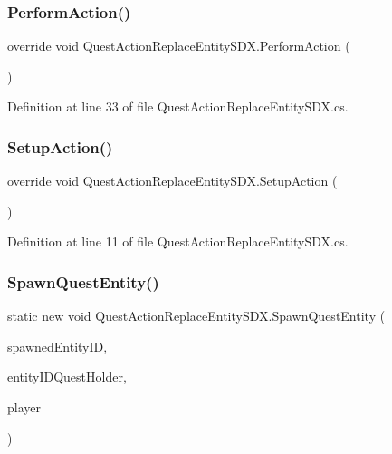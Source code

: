 \mbox{\label{class_quest_action_replace_entity_s_d_x_a01f8dc126bd37662f40449931ce327ba}} 
\subsubsection{\texorpdfstring{PerformAction()}{PerformAction()}}
{\footnotesize\ttfamily override void Quest\+Action\+Replace\+Entity\+S\+D\+X.\+Perform\+Action (\begin{DoxyParamCaption}{ }\end{DoxyParamCaption})}



Definition at line 33 of file Quest\+Action\+Replace\+Entity\+S\+D\+X.\+cs.

\mbox{\label{class_quest_action_replace_entity_s_d_x_a28155d29875c6d123001c03de564a6a6}} 
\subsubsection{\texorpdfstring{SetupAction()}{SetupAction()}}
{\footnotesize\ttfamily override void Quest\+Action\+Replace\+Entity\+S\+D\+X.\+Setup\+Action (\begin{DoxyParamCaption}{ }\end{DoxyParamCaption})}



Definition at line 11 of file Quest\+Action\+Replace\+Entity\+S\+D\+X.\+cs.

\mbox{\label{class_quest_action_replace_entity_s_d_x_a8f4b438b4a683e051201e70381149959}} 
\subsubsection{\texorpdfstring{SpawnQuestEntity()}{SpawnQuestEntity()}}
{\footnotesize\ttfamily static new void Quest\+Action\+Replace\+Entity\+S\+D\+X.\+Spawn\+Quest\+Entity (\begin{DoxyParamCaption}\item[{int}]{spawned\+Entity\+ID,  }\item[{int}]{entity\+I\+D\+Quest\+Holder,  }\item[{Entity\+Player}]{player }\end{DoxyParamCaption})\hspace{0.3cm}{\ttfamily [static]}}



